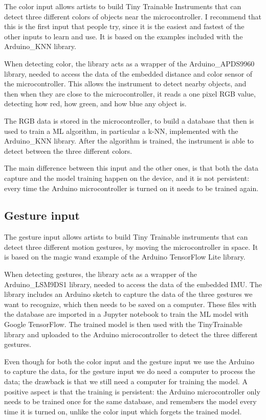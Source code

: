 The color input allows artists to build Tiny Trainable Instruments that can detect three different colors of objects near the microcontroller. I recommend that this is the first input that people try, since it is the easiest and fastest of the other inputs to learn and use. It is based on the examples included with the Arduino{\_}KNN library.

When detecting color, the library acts as a wrapper of the Arduino{\_}APDS9960 library, needed to access the data of the embedded distance and color sensor of the microcontroller. This allows the instrument to detect nearby objects, and then when they are close to the microcontroller, it reads a one pixel \acrshort{RGB} value, detecting how red, how green, and how blue any object is.

The \acrshort{RGB} data is stored in the microcontroller, to build a database that then is used to train a \acrshort{ML} algorithm, in particular a \acrfull{k-NN}, implemented with the Arduino{\_}KNN library. After the algorithm is trained, the instrument is able to detect between the three different colors.

The main difference between this input and the other ones, is that both the data capture and the model training happen on the device, and it is not persistent: every time the Arduino microcontroller is turned on it needs to be trained again.

\subsection{Gesture input}

The gesture input allows artists to build Tiny Trainable instruments that can detect three different motion gestures, by moving the microcontroller in space. It is based on the magic wand example of the Arduino TensorFlow Lite library.

When detecting gestures, the library acts as a wrapper of the Arduino{\_}LSM9DS1 library, needed to access the data of the embedded \acrfull{IMU}. The library includes an Arduino sketch to capture the data of the three gestures we want to recognize, which then needs to be saved on a computer. These files with the database are imported in a Jupyter notebook to train the \acrshort{ML} model with Google TensorFlow. The trained model is then used with the TinyTrainable library and uploaded to the Arduino microcontroller to detect the three different gestures.

Even though for both the color input and the gesture input we use the Arduino to capture the data, for the gesture input we do need a computer to process the data; the drawback is that we still need a computer for training the model. A positive aspect is that the training is persistent: the Arduino microcontroller only needs to be trained once for the same database, and remembers the model every time it is turned on, unlike the color input which forgets the trained model.

